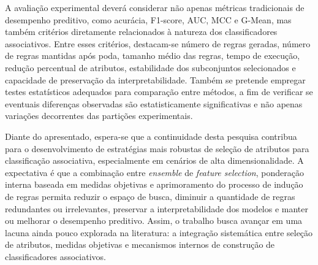 A avaliação experimental deverá considerar não apenas métricas tradicionais de desempenho preditivo, como acurácia, F1-score, AUC, MCC e G-Mean, mas também critérios diretamente relacionados à natureza dos classificadores associativos. Entre esses critérios, destacam-se número de regras geradas, número de regras mantidas após poda, tamanho médio das regras, tempo de execução, redução percentual de atributos, estabilidade dos subconjuntos selecionados e capacidade de preservação da interpretabilidade. Também se pretende empregar testes estatísticos adequados para comparação entre métodos, a fim de verificar se eventuais diferenças observadas são estatisticamente significativas e não apenas variações decorrentes das partições experimentais.

Diante do apresentado, espera-se que a continuidade desta pesquisa contribua para o desenvolvimento de estratégias mais robustas de seleção de atributos para classificação associativa, especialmente em cenários de alta dimensionalidade. A expectativa é que a combinação entre \textit{ensemble} de \textit{feature selection}, ponderação interna baseada em medidas objetivas e aprimoramento do processo de indução de regras permita reduzir o espaço de busca, diminuir a quantidade de regras redundantes ou irrelevantes, preservar a interpretabilidade dos modelos e manter ou melhorar o desempenho preditivo. Assim, o trabalho busca avançar em uma lacuna ainda pouco explorada na literatura: a integração sistemática entre seleção de atributos, medidas objetivas e mecanismos internos de construção de classificadores associativos.
